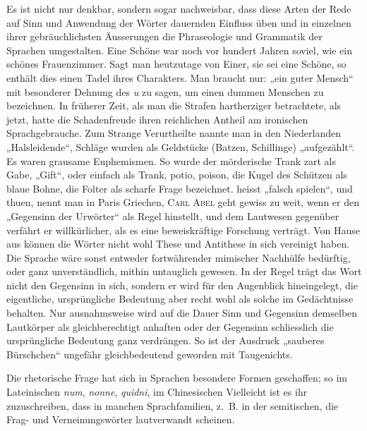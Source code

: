 {\label{fp.242}

Es ist nicht nur denkbar, sondern sogar nachweisbar, dass diese Arten der Rede auf Sinn und Anwendung der Wörter dauernden Einfluss üben und in einzelnen ihrer gebräuchlichsten Äusserungen die Phraseologie und Grammatik der Sprachen umgestalten. Eine Schöne war noch vor hundert Jahren soviel, wie ein schönes Frauenzimmer. Sagt man heutzutage von Einer, sie sei eine Schöne, so enthält dies einen Tadel ihres Charakters. Man braucht nur: „ein guter Mensch“ mit besonderer Dehnung des \textit{u} zu sagen, um einen dummen Menschen zu bezeichnen. In früherer Zeit, als man die Strafen hartherziger betrachtete, als jetzt, hatte die Schadenfreude ihren reichlichen Antheil am ironischen Sprachgebrauche. Zum Strange Verurtheilte nannte man in den Niederlanden „Halsleidende“, Schläge wurden als Geldstücke (Batzen, Schillinge) „aufgezählt“. Es waren grausame Euphemismen. So wurde der mörderische Trank zart als Gabe, „Gift“, oder einfach als Trank, potio, poison, die Kugel des Schützen als blaue Bohne, die Folter als scharfe Frage bezeichnet.  heisst „falsch spielen“, und  thuen, nennt man in Paris Griechen,  \textsc{Carl Abel} geht gewiss zu weit, wenn er den „Gegensinn der Urwörter“ als Regel hinstellt, und dem Lautwesen gegenüber verfährt er willkürlicher, als es eine beweiskräftige Forschung verträgt. Von Hause aus können die Wörter nicht wohl These und Antithese in sich vereinigt haben. Die Sprache wäre sonst entweder fortwährender mimischer Nachhülfe bedürftig, oder ganz unverständlich, mithin untauglich gewesen. In der Regel trägt das Wort nicht den Gegensinn in sich, sondern er wird für den Augenblick hineingelegt, die eigentliche, ursprüngliche Bedeutung aber recht wohl als solche im Gedächtnisse behalten. Nur ausnahmsweise wird auf die Dauer Sinn und Gegensinn demselben Lautkörper als gleichberechtigt anhaften oder der Gegensinn schliesslich die ursprüngliche Bedeutung ganz verdrängen. So ist der Ausdruck „sauberes Bürschchen“ ungefähr gleichbedeutend geworden mit Taugenichts.

Die rhetorische Frage hat sich in  Sprachen besondere Formen geschaffen; so im Lateinischen \textit{num}, \textit{nonne}, \textit{quidni}, im Chinesischen   Vielleicht ist es ihr zuzuschreiben, dass in manchen Sprachfamilien, z.~B. in der semitischen, die Frag- und Verneinungswörter lautverwandt scheinen. 

}
